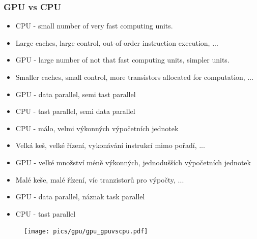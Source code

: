 \begin{frame}
\frametitle{GPU vs CPU}
  \scriptsize

	\begin{itemize}
	\item CPU - small number of very fast computing units.
	\item Large caches, large control, out-of-order instruction execution, ...
	\item GPU - large number of not that fast computing units, simpler units.
	\item Smaller caches, small control, more transistors allocated for computation, ...
  \item GPU - data parallel, semi tast parallel
  \item CPU - tast parallel, semi data parallel
	\end{itemize}

	\begin{itemize}
	\item CPU - málo, velmi výkonných výpočetních jednotek
	\item Velká keš, velké řízení, vykonávání instrukcí mimo pořadí, ...
	\item GPU - velké množství méně výkonných, jednodušších výpočetních jednotek
	\item Malé keše, malé řízení, víc tranzistorů pro výpočty, ...
  \item GPU - data parallel, náznak task parallel
  \item CPU - tast parallel
	\end{itemize}
	\begin{figure}[h]
	\texttt{[image: pics/gpu/gpu\_gpuvscpu.pdf]}
	\end{figure}
\end{frame}

